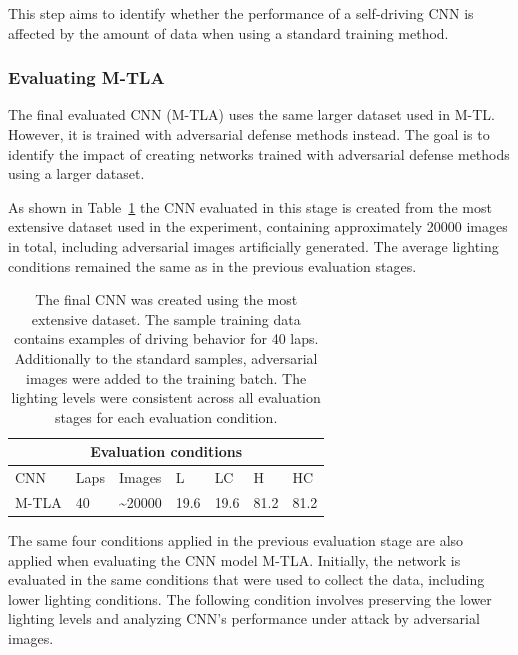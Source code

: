 \documentclass[12pt]{article}
\begin{document}
This step aims to identify whether the performance of a self-driving CNN is affected by the amount of data when using a standard training method.

\subsubsection{Evaluating M-TLA }

The final evaluated CNN (M-TLA) uses the same larger dataset used in M-TL. However, it is trained with adversarial defense methods instead. The goal is to identify the impact of creating networks trained with adversarial defense methods using a larger dataset.

As shown in Table~\ref{tab:test4method} the CNN evaluated in this stage is created from the most extensive dataset used in the experiment, containing approximately 20000 images in total, including adversarial images artificially generated. The average lighting conditions remained the same as in the previous evaluation stages. 

\begin{table}[H]
\begin{center}
\begin{tabular}{ |p{3cm}|p{1cm}|p{2cm}|p{1cm}|p{1cm}|p{1cm}|p{1cm}|  }
 \hline
 \multicolumn{7}{|c|}{Evaluation conditions} \\
 \hline
 CNN & Laps & Images & L  & LC & H  & HC \\
 \hline
 M-TLA & 40 & \textasciitilde20000 & 19.6 & 19.6  & 81.2 & 81.2\\
\hline
\end{tabular}
\caption{\label{tab:test4method}The final CNN was created using the most extensive dataset. The sample training data contains examples of driving behavior for 40 laps. Additionally to the standard samples, adversarial images were added to the training batch. The lighting levels were consistent across all evaluation stages for each evaluation condition. }
\end{center}
\end{table}

The same four conditions applied in the previous evaluation stage are also applied when evaluating the CNN model M-TLA. Initially, the network is evaluated in the same conditions that were used to collect the data, including lower lighting conditions. The following condition involves preserving the lower lighting levels and analyzing CNN's performance under attack by adversarial images. 
\end{document}
